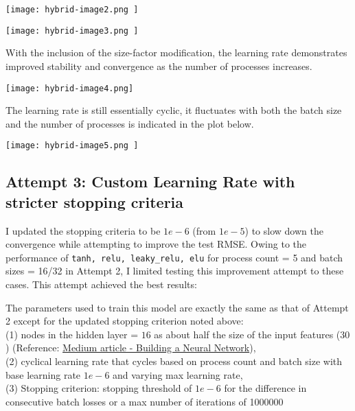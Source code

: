\documentclass{article}
\begin{document}
\begin{center}
\texttt{[image: hybrid-image2.png ]}
\end{center}

\begin{center}
\texttt{[image: hybrid-image3.png ]}
\end{center}

With the inclusion of the size-factor modification, the learning rate demonstrates improved stability and convergence as the number of processes increases.

\begin{center}
\texttt{[image: hybrid-image4.png]}
\end{center}

The learning rate is still essentially cyclic, it fluctuates with both the batch size and the number of processes is indicated in the plot below.

\begin{center}
\texttt{[image: hybrid-image5.png ]}
\end{center}

\subsection{Attempt 3: Custom Learning Rate with stricter stopping criteria}

I updated the stopping criteria to be $1e-6$ (from $1e-5$) to slow down the convergence while attempting to improve the test RMSE. Owing to the performance of \verb|tanh, relu, leaky_relu, elu| for process count = 5 and batch sizes = 16/32 in Attempt 2, I limited testing this improvement attempt to these cases. This attempt achieved the best results:

The parameters used to train this model are exactly the same as that of Attempt 2 except for the updated stopping criterion noted above: \\
(1) nodes in the hidden layer = $16$ as about half the size of the input features ($30$) (Reference: \href{https://medium.com/data-science/17-rules-of-thumb-for-building-a-neural-network-93356f9930af}{Medium article - Building a Neural Network}), \\
(2) cyclical learning rate that cycles based on process count and batch size with base learning rate $1e-6$ and varying max learning rate, \\
(3) Stopping criterion: stopping threshold of $1e-6$ for the difference in consecutive batch losses or a max number of iterations of 1000000 \\
\end{document}
